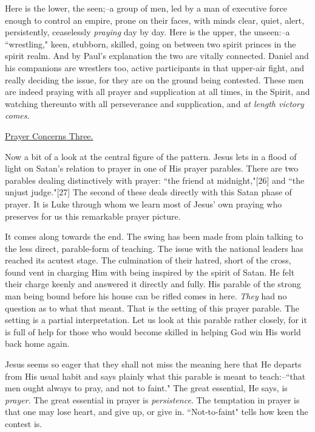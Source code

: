 Here is the lower, the seen;--a group of men, led by a man of executive
force enough to control an empire, prone on their faces, with minds clear,
quiet, alert, persistently, ceaselessly \textit{praying} day by day. Here is the
upper, the unseen:--a ``wrestling," keen, stubborn, skilled, going on
between two spirit princes in the spirit realm. And by Paul's explanation
the two are vitally connected. Daniel and his companions are wrestlers
too, active participants in that upper-air fight, and really deciding the
issue, for they are on the ground being contested. These men are indeed
praying with all prayer and supplication at all times, in the Spirit, and
watching thereunto with all perseverance and supplication, and \textit{at length
victory comes}.



\underline{Prayer Concerns Three.}


Now a bit of a look at the central figure of the pattern. Jesus lets in a
flood of light on Satan's relation to prayer in one of His prayer
parables. There are two parables dealing distinctively with prayer: ``the
friend at midnight,"[26] and ``the unjust judge."[27] The second of these
deals directly with this Satan phase of prayer. It is Luke through whom we
learn most of Jesus' own praying who preserves for us this remarkable
prayer picture.

It comes along towards the end. The swing has been made from plain talking
to the less direct, parable-form of teaching. The issue with the national
leaders has reached its acutest stage. The culmination of their hatred,
short of the cross, found vent in charging Him with being inspired by the
spirit of Satan. He felt their charge keenly and answered it directly and
fully. His parable of the strong man being bound before his house can be
rifled comes in here. \textit{They} had no question as to what that meant. That
is the setting of this prayer parable. The setting is a partial
interpretation. Let us look at this parable rather closely, for it is full
of help for those who would become skilled in helping God win His world
back home again.

Jesus seems so eager that they shall not miss the meaning here that He
departs from His usual habit and says plainly what this parable is meant
to teach:--``that men ought always to pray, and not to faint." The great
essential, He says, is \textit{prayer}. The great essential in prayer is
\textit{persistence}. The temptation in prayer is that one may lose heart, and
give up, or give in. ``Not-to-faint" tells how keen the contest is.

